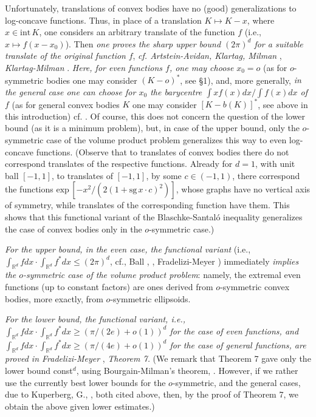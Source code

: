 \documentclass[12pt]{article}
\begin{document}
Unfortunately, translations of convex bodies have no (good) generalizations
to log-concave functions. 
Thus, in place of a translation $K \mapsto K-x$, where $x \in {\text{int}}\,K$,
one considers an arbitrary translate of the function $f$ (i.e., $x \mapsto 
f(x-x_0)$). Then {\it{one proves the sharp upper bound $(2 \pi )^d$
for a suitable translate of the
original function}} $f$, {\it{cf. Artstein-Avidan, Klartag, Milman}} 
\cite{A-AKM}, 
{\it{Klartag-Milman}} \cite{KM}. {\it{Here, 
for even functions $f$, one may choose}} $x_0=o$ (as for
$o$-symmetric bodies one may consider $(K-o)^*$, see \S 1), 
and, more generally, {\it{in the
general case one can choose for $x_0$
the barycentre $\int xf(x)dx / \int f(x)dx$ of}} $f$ (as for general convex
bodies $K$ one may consider $[ K-b(K) ]^*$, 
see above in this introduction) cf. \cite{A-AKM}.
Of course, this does not concern the question of the
lower bound (as it is a minimum problem), 
but, in case of the upper bound, only the $o$-symmetric case of the
volume product problem generalizes this way to even log-concave functions.
(Observe that to translates of
convex bodies there do not correspond translates of the respective functions.
Already for $d=1$, with unit ball $[-1,1]$, to translates of $[-1,1]$,
by some $c
\in (-1,1)$, there correspond the functions ${\text{exp}}\, [  
-x^2/\left( 2(1+{\text{sg}}\,x \cdot c) ^2 \right) ]$, whose graphs have no
vertical axis of symmetry, while translates of the corresponding function 
have them. This shows that this functional variant of the Blaschke-Santal\'o
inequality generalizes the case of convex bodies
only in the $o$-symmetric case.)

{\it{For the upper bound, in the even case, the functional variant}}
(i.e., $\int _{{\mathbb R}^d} fdx \cdot \int _{{\mathbb R}^d} f^*dx \le (2 \pi
)^d$, cf., Ball \cite{Bal}, \cite{A-AKM}, Fradelizi-Meyer \cite{FM07})
immediately {\it{implies
the $o$-symmetric case of the volume product problem}}: namely, the extremal
even functions (up to constant factors)
are ones derived from $o$-symmetric convex bodies, more exactly, from 
$o$-symmetric
ellipsoids. 

{\it{For
the lower bound, the functional variant, i.e., $\int _{{\mathbb R}^d} fdx 
\cdot \int _{{\mathbb R}^d} f^*dx \ge \left( \pi / (2e) +o(1) \right) ^d$
for the case of even functions, and $\int _{{\mathbb R}^d} fdx 
\cdot \int _{{\mathbb R}^d} f^*dx \ge \left( \pi / (4e) +o(1) \right) ^d$
for the case of general functions, are 
proved in Fradelizi-Meyer}} \cite{FM08a}, {\it{Theorem 7.}}
(We remark that \cite{FM08a} Theorem 7 gave only the lower bound const$^d$,
using Bourgain-Milman's theorem, \cite{BoMi}. However, if we rather use the
currently best lower bounds for the $o$-symmetric, and the general cases, 
due to Kuperberg, G., \cite{K08}, both cited above, then, by the proof of
\cite{FM08a} Theorem 7,
we obtain the above given lower estimates.) 
\end{document}

